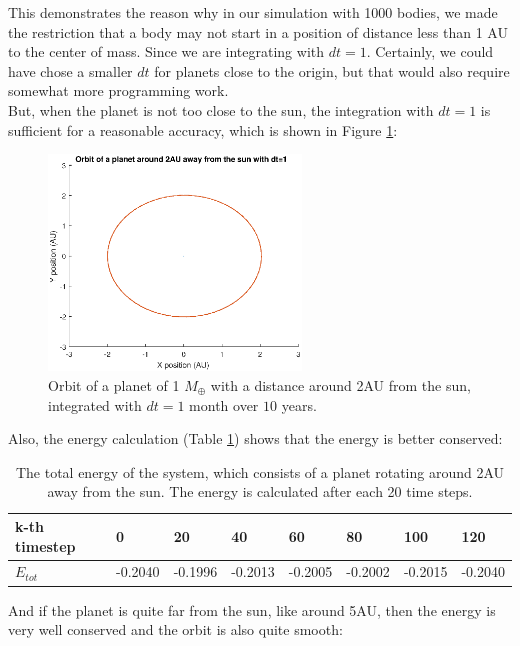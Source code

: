 This demonstrates the reason why in our simulation with 1000 bodies, we made the restriction that a body may not start in a position of distance less than 1 AU to the center of mass. 
Since we are integrating with $dt=1$. 
Certainly, we could have chose a smaller $dt$ for planets close to the origin, but that would also require somewhat more programming work.\\

But, when the planet is not too close to the sun, the integration with $dt=1$ is sufficient for a reasonable accuracy, which is shown in Figure \ref{fig:Planet2AUdt1}:

\begin{figure}[H]
\centering
\includegraphics[width=0.6\textwidth]{Planeet_2AU_dt1_10jaar.eps}
\caption{Orbit of a planet of 1 $M_{\oplus}$ with a distance around 2AU from the sun, integrated with $dt=1$ month over $10$ years.}
    \label{fig:Planet2AUdt1}
\end{figure}

Also, the energy calculation (Table \ref{tab:Planet2AUEnergy}) shows that the energy is better conserved:

\begin{table}[htb]
\centering
\caption{The total energy of the system, which consists of a planet rotating around 2AU away from the sun. The energy is calculated after each 20 time steps.}
\begin{tabular}{|l|l|l|l|l|l|l|l|}
\hline
k-th timestep&0&20&40&60&80&100&120\\ \hline
$E_{tot}$&-0.2040&   -0.1996&   -0.2013&   -0.2005&   -0.2002&   -0.2015&   -0.2040\\ \hline
\end{tabular}

\label{tab:Planet2AUEnergy}
\end{table}

And if the planet is quite far from the sun, like around 5AU, then the energy is very well conserved and the orbit is also quite smooth:

